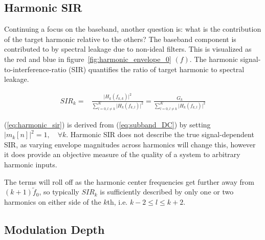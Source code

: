 \documentclass [11pt, proquest,oneside] {ganter_thesis}[2015/03/03]
\begin{document}


\subsection{Harmonic SIR}

Continuing a focus on the baseband, another question is: what is the contribution of the target harmonic relative to the others?  The baseband component is contributed to by spectral leakage due to non-ideal filters.  This is visualized as the red and blue in figure~\ref{fig:harmonic_envelope_0} $(f)$.  The harmonic signal-to-interference-ratio (SIR) quantifies the ratio of target harmonic to spectral leakage.

\begin{align}
\label{eq:harmonic_sir}
SIR_k =& \frac{\Big| H_k(f_{k,k}) \Big|^2} {\sum\limits_{l=0, l \neq k}^K \Big|H_k(f_{k,l})\Big|^2} = \frac{G_k} {\sum\limits_{l=0, l \neq k}^K \Big|H_k(f_{k,l})\Big|^2}
\end{align}

(\ref{eq:harmonic_sir}) is derived from (\ref{eq:subband_DC}) by setting $\Big|m_k[n]\Big|^2 = 1, \quad \forall k$.  Harmonic SIR does not describe the true signal-dependent SIR, as varying envelope magnitudes across harmonics will change this, however it does provide an objective measure of the quality of a system to arbitrary harmonic inputs.

The terms will roll off as the harmonic center frequencies get further away from $(k+1)\tilde{f}_0$, so typically $SIR_k$ is sufficiently described by only one or two harmonics on either side of the $k$th, i.e. $k-2 \leq l \leq k+2$.



\subsection{Modulation Depth}
\end{document}
